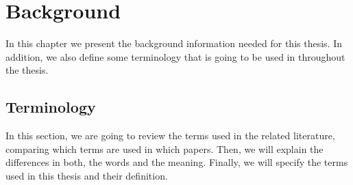\chapter{Background}\label{ch:Background}
In this chapter we present the background information needed for this thesis. In addition, we also define some terminology that is going to be used in throughout the thesis.

\section{Terminology}
In this section, we are going to review the terms used in the related literature, comparing which terms are used in which papers. Then, we will explain the differences in both, the words and the meaning. Finally, we will specify the terms used in this thesis and their definition.

